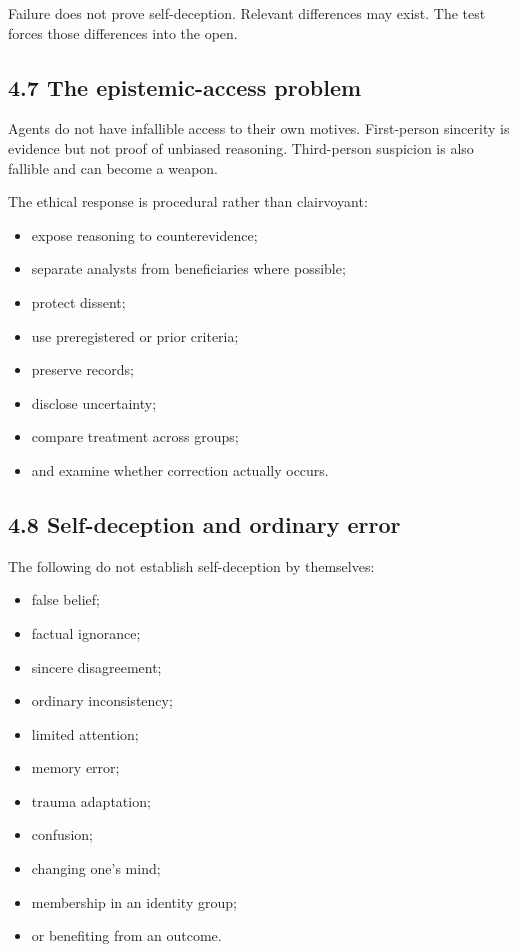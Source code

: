 \documentclass[
  11pt,
]{article}
\providecommand{\tightlist}{%
  \setlength{\itemsep}{0pt}\setlength{\parskip}{0pt}}
\begin{document}
Failure does not prove self-deception. Relevant differences may exist.
The test forces those differences into the open.

\subsection{4.7 The epistemic-access
problem}\label{the-epistemic-access-problem}

Agents do not have infallible access to their own motives. First-person
sincerity is evidence but not proof of unbiased reasoning. Third-person
suspicion is also fallible and can become a weapon.

The ethical response is procedural rather than clairvoyant:

\begin{itemize}
\tightlist
\item
  expose reasoning to counterevidence;
\item
  separate analysts from beneficiaries where possible;
\item
  protect dissent;
\item
  use preregistered or prior criteria;
\item
  preserve records;
\item
  disclose uncertainty;
\item
  compare treatment across groups;
\item
  and examine whether correction actually occurs.
\end{itemize}

\subsection{4.8 Self-deception and ordinary
error}\label{self-deception-and-ordinary-error}

The following do not establish self-deception by themselves:

\begin{itemize}
\tightlist
\item
  false belief;
\item
  factual ignorance;
\item
  sincere disagreement;
\item
  ordinary inconsistency;
\item
  limited attention;
\item
  memory error;
\item
  trauma adaptation;
\item
  confusion;
\item
  changing one's mind;
\item
  membership in an identity group;
\item
  or benefiting from an outcome.
\end{itemize}
\end{document}
